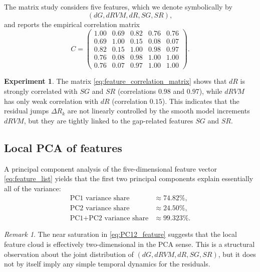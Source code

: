 \documentclass[11pt]{amsart}
\numberwithin{equation}{section}
\theoremstyle{plain}
\theoremstyle{definition}
\newtheorem{experiment}[theorem]{Experiment}
\theoremstyle{remark}
\newtheorem{remark}[theorem]{Remark}
\begin{document}
The matrix study considers five features,
which we denote symbolically by
\begin{equation}
(dG, dRVM, dR, SG, SR),
\label{eq:feature_list}
\end{equation}
and reports the empirical correlation matrix
\begin{equation}
C =
\begin{pmatrix}
1.00 & 0.69 & 0.82 & 0.76 & 0.76 \\
0.69 & 1.00 & 0.15 & 0.08 & 0.07 \\
0.82 & 0.15 & 1.00 & 0.98 & 0.97 \\
0.76 & 0.08 & 0.98 & 1.00 & 1.00 \\
0.76 & 0.07 & 0.97 & 1.00 & 1.00
\end{pmatrix}.
\label{eq:feature_correlation_matrix}
\end{equation}

\begin{experiment}
\label{exp:feature_correlation}
The matrix \eqref{eq:feature_correlation_matrix}
shows that $dR$ is strongly correlated with $SG$ and $SR$
(correlations $0.98$ and $0.97$),
while $dRVM$ has only weak correlation with $dR$
(correlation $0.15$).
This indicates that the residual jumps $\Delta R_k$
are not linearly controlled by the smooth model increments $dRVM$,
but they are tightly linked to the gap-related features $SG$ and $SR$.
\end{experiment}

\subsection{Local PCA of features}
\label{subsec:local_pca_features}

A principal component analysis of the five-dimensional feature vector
\eqref{eq:feature_list} yields that the first two principal components
explain essentially all of the variance:
\begin{align}
\text{PC1 variance share} &\approx 74.82\%,
\label{eq:PC1_feature}\\
\text{PC2 variance share} &\approx 24.50\%,
\label{eq:PC2_feature}\\
\text{PC1+PC2 variance share} &\approx 99.323\%.
\label{eq:PC12_feature}
\end{align}

\begin{remark}
\label{rem:feature_pca_rank}
The near saturation in \eqref{eq:PC12_feature}
suggests that the local feature cloud
is effectively two-dimensional in the PCA sense.
This is a structural observation about the joint distribution of
$(dG,dRVM,dR,SG,SR)$, but it does not by itself imply
any simple temporal dynamics for the residuals.
\end{remark}
\end{document}
